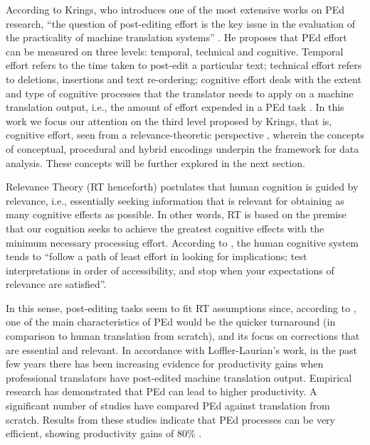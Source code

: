 \documentclass[output=paper]{langsci/langscibook}
\begin{document}
According to Krings, who introduces one of the most extensive works on PEd research, ``the question of post-editing effort is the key issue in the evaluation of the practicality of machine translation systems'' \citep[178]{krings2001}. He proposes that PEd effort can be measured on three levels: temporal, technical and cognitive. Temporal effort refers to the time taken to post-edit a particular text; technical effort refers to deletions, insertions and text re-ordering; cognitive effort deals with the extent and type of cognitive processes that the translator needs to apply on a machine translation output, i.e., the amount of effort expended in a PEd task \citep{obrien2006}. In this work we focus our attention on the third level proposed by Krings, that is, cognitive effort, seen from a relevance-theoretic perspective \citep{Sperber1986second}, wherein the concepts of conceptual, procedural and hybrid encodings underpin the framework for data analysis. These concepts will be further explored in the next section.



Relevance Theory (RT henceforth) postulates that human cognition is guided by relevance, i.e., essentially seeking information that is relevant for obtaining as many cognitive effects as possible. In other words, RT is based on the premise that our cognition seeks to achieve the greatest cognitive effects with the minimum necessary processing effort. According to \citet[72]{Wilson2011}, the human cognitive system tends to ``follow a path of least effort in looking for implications; test interpretations in order of accessibility, and stop when your expectations of relevance are satisfied''. 



In this sense, post-editing tasks seem to fit RT assumptions since, according to \citet{LofflerLaurian1984, LofflerLaurian1996}, one of the main characteristics of PEd would be the quicker turnaround (in comparison to human translation from scratch), and its focus on corrections that are essential and relevant. In accordance with Loffler-Laurian's work, in the past few years there has been increasing evidence for productivity gains when professional translators have post-edited machine translation output. Empirical research has demonstrated that PEd can lead to higher productivity. A significant number of studies have compared PEd against translation from scratch. Results from these studies indicate that PEd processes can be very efficient, showing productivity gains of 80\% \citep{Plitt2010, skadicnvs2011, pouliquen2011, federico2012}. 
\end{document}
